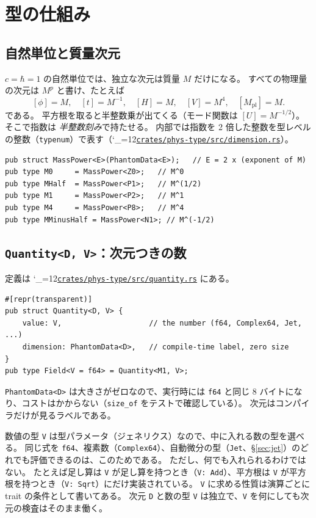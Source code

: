 \documentclass[a4paper,11pt]{ltjsarticle}
\newcommand{\Mpl}{M_{\mathrm{pl}}}
\newcommand{\code}[1]{\texttt{#1}}
\newcommand{\repourl}{https://github.com/inuverse44/phys-type-dev}
\newcommand{\reporev}{b1fea87}
\newcommand{\repo}{\begingroup\catcode`\_=12\relax\repoaux}
\newcommand{\repoaux}[1]{\href{\repourl/blob/\reporev/#1}{\nolinkurl{#1}}\endgroup}
\begin{document}
\section{型の仕組み}
\label{sec:types}

\subsection{自然単位と質量次元}

$c=\hbar=1$ の自然単位では、独立な次元は質量 $M$ だけになる。
すべての物理量の次元は $M^{p}$ と書け、たとえば
\[
[\phi]=M,\quad [t]=M^{-1},\quad [H]=M,\quad [V]=M^4,\quad [\Mpl]=M .
\]
である。
平方根を取ると半整数乗が出てくる（モード関数は $[U]=M^{-1/2}$）。
そこで指数は \emph{半整数刻み}で持たせる。
内部では指数を 2 倍した整数を型レベルの整数（\code{typenum}）で表す（\repo{crates/phys-type/src/dimension.rs}）。

\begin{lstlisting}
pub struct MassPower<E>(PhantomData<E>);   // E = 2 x (exponent of M)
pub type M0     = MassPower<Z0>;   // M^0
pub type MHalf  = MassPower<P1>;   // M^(1/2)
pub type M1     = MassPower<P2>;   // M^1
pub type M4     = MassPower<P8>;   // M^4
pub type MMinusHalf = MassPower<N1>; // M^(-1/2)
\end{lstlisting}

\subsection{\texorpdfstring{\code{Quantity<D, V>}}{Quantity<D, V>}：次元つきの数}

定義は \repo{crates/phys-type/src/quantity.rs} にある。

\begin{lstlisting}
#[repr(transparent)]
pub struct Quantity<D, V> {
    value: V,                    // the number (f64, Complex64, Jet, ...)
    dimension: PhantomData<D>,   // compile-time label, zero size
}
pub type Field<V = f64> = Quantity<M1, V>;
\end{lstlisting}

\code{PhantomData<D>} は大きさがゼロなので、実行時には \code{f64} と同じ 8 バイトになり、コストはかからない（\code{size\_of} をテストで確認している）。
次元はコンパイラだけが見るラベルである。

数値の型 \code{V} は型パラメータ（ジェネリクス）なので、中に入れる数の型を選べる。
同じ式を \code{f64}、複素数（\code{Complex64}）、自動微分の型（\code{Jet}、\S\ref{sec:jet}）のどれでも評価できるのは、このためである。
ただし、何でも入れられるわけではない。
たとえば足し算は \code{V} が足し算を持つとき（\code{V: Add}）、平方根は \code{V} が平方根を持つとき（\code{V: Sqrt}）にだけ実装されている。
\code{V} に求める性質は演算ごとに trait の条件として書いてある。
次元 \code{D} と数の型 \code{V} は独立で、\code{V} を何にしても次元の検査はそのまま働く。
\end{document}
